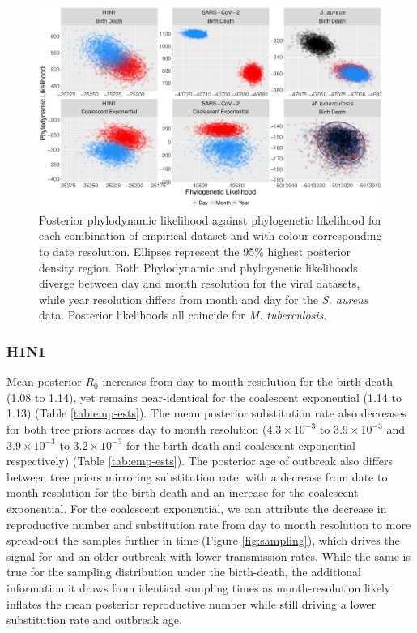 \documentclass[11pt]{article}
\begin{document}
\begin{spacing}{1.5}
\begin{figure}[H]
    \centering
    \includegraphics[width=\textwidth]{figures/empirical_likelihood.pdf}
    \caption{Posterior phylodynamic likelihood against phylogenetic likelihood for each combination of empirical dataset and with colour corresponding to date resolution. Ellipses represent the 95\% highest posterior density region. Both Phylodynamic and phylogenetic likelihoods diverge between day and month resolution for the viral datasets, while year resolution differs from month and day for the \textit{S. aureus} data. Posterior likelihoods all coincide for \textit{M. tuberculosis}. }
    \label{fig:emp-likelihood}
\end{figure}

\subsubsection*{H1N1}
Mean posterior $R_0$ increases from day to month resolution for the birth death (1.08 to 1.14), yet remains near-identical for the coalescent exponential (1.14 to 1.13) (Table \ref{tab:emp-ests}). The mean posterior substitution rate also decreases for both tree priors across day to month resolution ($4.3\times10^{-3}$ to $3.9\times10^{-3}$ and $3.9\times10^{-3}$ to $3.2\times10^{-3}$ for the birth death and coalescent exponential respectively) (Table \ref{tab:emp-ests}). The posterior age of outbreak also differs between tree priors mirroring substitution rate, with a decrease from date to month resolution for the birth death and an increase for the coalescent exponential. For the coalescent exponential, we can attribute the decrease in reproductive number and substitution rate from day to month resolution to more spread-out the samples further in time (Figure \ref{fig:sampling}), which drives the signal for and an older outbreak with lower transmission rates. While the same is true for the sampling distribution under the birth-death, the additional information it draws from identical sampling times as month-resolution likely inflates the mean posterior reproductive number while still driving a lower substitution rate and outbreak age.


\end{spacing}
\end{document}
